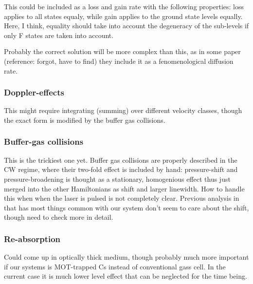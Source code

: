 \documentclass{article}
\begin{document}
\begin{spacing}{1.1}
This could be included as a loss and gain rate with the following properties: loss applies to all states equaly, while gain applies to the ground state levels equally. Here, I think, equality should take into account the degeneracy of the sub-levels if only F states are taken into account.

Probably the correct solution will be more complex than this, as in some paper (reference: forgot, have to find) they include it as a fenomenological diffusion rate.

\subsubsection{Doppler-effects}

This might require integrating (summing) over different velocity classes, though the exact form is modified by the buffer gas collisions.

\subsubsection{Buffer-gas collisions}

This is the trickiest one yet. Buffer gas collisions are properly described in the CW regime, where their two-fold effect is included by hand: pressure-shift and pressure-broadening is thought as a stationary, homogenious effect thus just merged into the other Hamiltonians as shift and larger linewidth. How to handle this when when the laser is pulsed is not completely clear. Previous analysis in \cite{Riley1979} that has most things common with our system don't seem to care about the shift, though need to check more in detail.

\subsubsection{Re-absorption}

Could come up in optically thick medium, though probably much more important if our systems is MOT-trapped Cs instead of conventional gass cell. In the current case it is much lower level effect that can be neglected for the time being.





\end{spacing}
\end{document}
